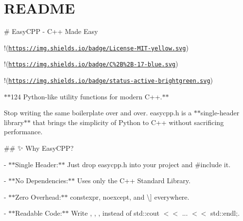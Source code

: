 \chapter{README }
\hypertarget{md__r_e_a_d_m_e}{}\label{md__r_e_a_d_m_e}
\# Easy\+CPP -\/ C++ Made Easy 🚀

!\+(\href{https://img.shields.io/badge/License-MIT-yellow.svg}{\texttt{https:\+/\+/\+img.\+shields.\+io/\+badge/\+\+License-\/\+MIT-\/yellow.\+svg}})

!\+[Standard:\+ C++17]\+(\href{https://img.shields.io/badge/C\%2B\%2B-17-blue.svg}{\texttt{https:\+/\+/\+img.\+shields.\+io/\+badge/\+\+C\%2\+B\%2\+B-\/17-\/blue.\+svg}})

!\+(\href{https://img.shields.io/badge/status-active-brightgreen.svg}{\texttt{https:\+/\+/\+img.\+shields.\+io/\+badge/\+status-\/active-\/brightgreen.\+svg}})

\texorpdfstring{$\ast$}{*}\texorpdfstring{$\ast$}{*}124 Python-\/like utility functions for modern C++.\texorpdfstring{$\ast$}{*}\texorpdfstring{$\ast$}{*} ~\newline


Stop writing the same boilerplate over and over. {\ttfamily easycpp.\+h} is a \texorpdfstring{$\ast$}{*}\texorpdfstring{$\ast$}{*}single-\/header library\texorpdfstring{$\ast$}{*}\texorpdfstring{$\ast$}{*} that brings the simplicity of Python to C++ without sacrificing performance.

\#\# ✨ Why Easy\+CPP?

-\/ \texorpdfstring{$\ast$}{*}\texorpdfstring{$\ast$}{*}\+Single Header:\+\texorpdfstring{$\ast$}{*}\texorpdfstring{$\ast$}{*} Just drop {\ttfamily easycpp.\+h} into your project and {\ttfamily \#include} it.

-\/ \texorpdfstring{$\ast$}{*}\texorpdfstring{$\ast$}{*}\+No Dependencies:\+\texorpdfstring{$\ast$}{*}\texorpdfstring{$\ast$}{*} Uses only the C++ Standard Library.

-\/ \texorpdfstring{$\ast$}{*}\texorpdfstring{$\ast$}{*}\+Zero Overhead:\+\texorpdfstring{$\ast$}{*}\texorpdfstring{$\ast$}{*} {\ttfamily constexpr}, {\ttfamily noexcept}, and {\ttfamily \textbackslash{}\+[\textbackslash{}\+[nodiscard]\+]\+} everywhere.

-\/ \texorpdfstring{$\ast$}{*}\texorpdfstring{$\ast$}{*}\+Readable Code:\+\texorpdfstring{$\ast$}{*}\texorpdfstring{$\ast$}{*} Write {\ttfamily {}}, {\ttfamily {}}, {\ttfamily {}}, {\ttfamily {}} instead of {\ttfamily std::\+cout \texorpdfstring{$<$}{<}\texorpdfstring{$<$}{<} ... \texorpdfstring{$<$}{<}\texorpdfstring{$<$}{<} std::\+endl;}.

